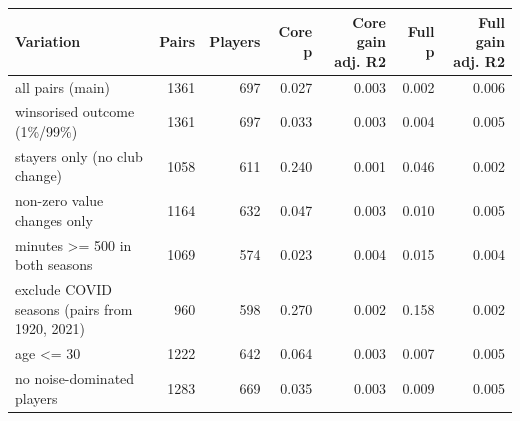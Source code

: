 \begin{tabular}{lrrrrrr}
\toprule
Variation & Pairs & Players & Core p & Core gain adj. R2 & Full p & Full gain adj. R2 \\
\midrule
all pairs (main) & 1361 & 697 & 0.027 & 0.003 & 0.002 & 0.006 \\
winsorised outcome (1\%/99\%) & 1361 & 697 & 0.033 & 0.003 & 0.004 & 0.005 \\
stayers only (no club change) & 1058 & 611 & 0.240 & 0.001 & 0.046 & 0.002 \\
non-zero value changes only & 1164 & 632 & 0.047 & 0.003 & 0.010 & 0.005 \\
minutes >= 500 in both seasons & 1069 & 574 & 0.023 & 0.004 & 0.015 & 0.004 \\
exclude COVID seasons (pairs from 1920, 2021) & 960 & 598 & 0.270 & 0.002 & 0.158 & 0.002 \\
age <= 30 & 1222 & 642 & 0.064 & 0.003 & 0.007 & 0.005 \\
no noise-dominated players & 1283 & 669 & 0.035 & 0.003 & 0.009 & 0.005 \\
\bottomrule
\end{tabular}
